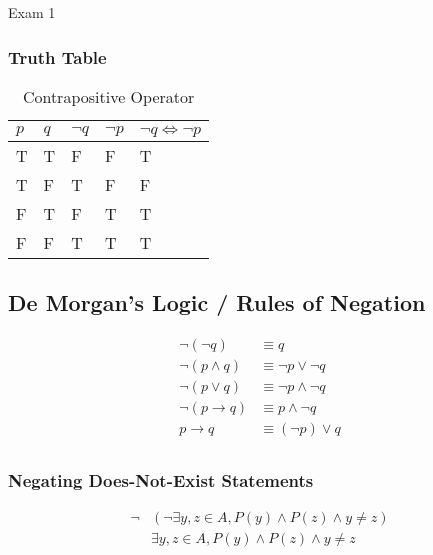 \documentclass{note}
\begin{document}
\begin{note}{Exam 1}
        \subsubsection{Truth Table}
        \begin{longtabu} to \textwidth{ | X[l, 1] | X[l, 1] | X[l, 1] | X[l, 1] | X[l, 1] | }
            \caption{Contrapositive Operator}\\
            \hline
            $ p $ & $ q $ & $ \neg q $ & $ \neg p $ & $ \neg q \Leftrightarrow \neg p $ \\ \hline \hline
            T & T & F & F & T\\ \hline
            T & F & T & F & F\\ \hline
            F & T & F & T & T\\ \hline
            F & F & T & T & T\\ \hline
        \end{longtabu}

        \subsection{De Morgan's Logic / Rules of Negation}

        \begin{align*}
            \neg \left(\neg q\right) &\equiv q\\
            \neg \left( p \wedge q \right) &\equiv \neg p \vee \neg q\\
            \neg \left( p \vee q \right) &\equiv \neg p \wedge \neg q\\
            \neg \left( p \to q \right) &\equiv p \wedge \neg q\\
            p \to q &\equiv \left( \neg p \right) \vee q\\
        \end{align*}

        \subsubsection{Negating Does-Not-Exist Statements}\label{sec: negate does not exist}
        \begin{align*}
            \neg &\left( \neg \exists y, z \in A, P \left( y \right) \wedge P \left( z \right) \wedge y \neq z \right)\\
            &\exists y, z \in A, P \left( y \right) \wedge P \left( z \right) \wedge y \neq z\\
        \end{align*}


\end{note}
\end{document}
